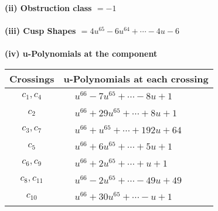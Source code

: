 \documentclass[1p]{elsarticle_modified}
\theoremstyle{definition}
\begin{document}
\flushleft \textbf{(ii) Obstruction class $= -1$}\\~\\
\flushleft \textbf{(iii) Cusp Shapes $= 4 u^{65}-6 u^{64}+\cdots-4 u-6$}\\~\\
\newpage\renewcommand{\arraystretch}{1}
\flushleft \textbf{(iv) u-Polynomials at the component}\newline \\
\begin{tabular}{m{50pt}|m{274pt}}
Crossings & \hspace{64pt}u-Polynomials at each crossing \\
\hline $$\begin{aligned}c_{1},c_{4}\end{aligned}$$&$\begin{aligned}
&u^{66}-7 u^{65}+\cdots-8 u+1
\end{aligned}$\\
\hline $$\begin{aligned}c_{2}\end{aligned}$$&$\begin{aligned}
&u^{66}+29 u^{65}+\cdots+8 u+1
\end{aligned}$\\
\hline $$\begin{aligned}c_{3},c_{7}\end{aligned}$$&$\begin{aligned}
&u^{66}+u^{65}+\cdots+192 u+64
\end{aligned}$\\
\hline $$\begin{aligned}c_{5}\end{aligned}$$&$\begin{aligned}
&u^{66}+6 u^{65}+\cdots+5 u+1
\end{aligned}$\\
\hline $$\begin{aligned}c_{6},c_{9}\end{aligned}$$&$\begin{aligned}
&u^{66}+2 u^{65}+\cdots+u+1
\end{aligned}$\\
\hline $$\begin{aligned}c_{8},c_{11}\end{aligned}$$&$\begin{aligned}
&u^{66}-2 u^{65}+\cdots-49 u+49
\end{aligned}$\\
\hline $$\begin{aligned}c_{10}\end{aligned}$$&$\begin{aligned}
&u^{66}+30 u^{65}+\cdots- u+1
\end{aligned}$\\
\hline
\end{tabular}\\~\\
\end{document}
